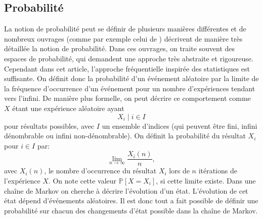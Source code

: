 \documentclass[letterpaper]{article}
\begin{document}
  \subsection{Probabilité}
    \label{probabilite}
    La notion de probabilité peut se définir de plusieurs manières différentes 
    et de nombreux ouvrages (comme par exemple celui de \citet{IP}) décrivent 
    de manière très détaillée la notion de probabilité.  Dans ces ouvrages, on
    traite souvent des espaces de probabilité, qui demandent une approche très 
    abstraite et rigoureuse.  Cependant dans cet article, l'approche
    fréquentielle inspirée des statistiques est suffisante.
    On définit donc la probabilité d'un événement aléatoire par la limite
    de la fréquence d’occurrence d'un événement pour un nombre d'expériences
    tendant vers l'infini.  De manière plus formelle, on peut décrire ce
    comportement comme $X$ étant une expérience aléatoire ayant
    $$X_i \mid i \in I $$
    pour résultats possibles, avec $I$ un ensemble d'indices (qui peuvent 
    être fini, infini dénombrable ou infini non-dénombrable).  On définit
    la probabilité du résultat $X_i$ pour $i \in I$ par:
    $$\lim_{n \to \infty}\frac {X_i(n)}n,$$
    avec $X_i(n)$, le nombre d'occurrence du résultat $X_i$ lors de
    $n$ itérations de l'expérience $X$.  On note cette valeur
    $\mathbb P[X = X_i]$, si cette limite existe.
    Dans une chaîne de Markov on cherche à décrire l'évolution d'un état.
    L'évolution de cet état dépend d'événements aléatoires.  Il est donc tout
    a fait possible de définir une probabilité sur chacun des changements
    d'état possible dans la chaîne de Markov.
    
\end{document}
